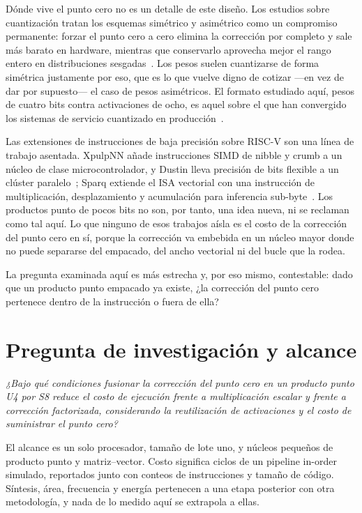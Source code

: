 Dónde vive el punto cero no es un detalle de este diseño. Los estudios sobre
cuantización tratan los esquemas simétrico y asimétrico como un compromiso
permanente: forzar el punto cero a cero elimina la corrección por completo y
sale más barato en hardware, mientras que conservarlo aprovecha mejor el rango
entero en distribuciones sesgadas~\cite{gholami}. Los pesos suelen cuantizarse
de forma simétrica justamente por eso, que es lo que vuelve digno de cotizar
—en vez de dar por supuesto— el caso de pesos asimétricos. El formato estudiado
aquí, pesos de cuatro bits contra activaciones de ocho, es aquel sobre el que
han convergido los sistemas de servicio cuantizado en producción~\cite{qserve}.

Las extensiones de instrucciones de baja precisión sobre RISC-V son una línea de
trabajo asentada. XpulpNN añade instrucciones SIMD de nibble y crumb a un núcleo
de clase microcontrolador, y Dustin lleva precisión de bits flexible a un
clúster paralelo~\cite{xpulpnn,dustin}; Sparq extiende el ISA vectorial con una
instrucción de multiplicación, desplazamiento y acumulación para inferencia
sub-byte~\cite{sparq}. Los productos punto de pocos bits no son, por tanto, una
idea nueva, ni se reclaman como tal aquí. Lo que ninguno de esos trabajos aísla
es el costo de la corrección del punto cero en sí, porque la corrección va
embebida en un núcleo mayor donde no puede separarse del empacado, del ancho
vectorial ni del bucle que la rodea.

La pregunta examinada aquí es más estrecha y, por eso mismo, contestable: dado
que un producto punto empacado ya existe, ¿la corrección del punto cero
pertenece dentro de la instrucción o fuera de ella?

\section{Pregunta de investigación y alcance}
\textit{¿Bajo qué condiciones fusionar la corrección del punto cero en un
producto punto U4 por S8 reduce el costo de ejecución frente a multiplicación
escalar y frente a corrección factorizada, considerando la reutilización de
activaciones y el costo de suministrar el punto cero?}

El alcance es un solo procesador, tamaño de lote uno, y núcleos pequeños de
producto punto y matriz--vector. Costo significa ciclos de un pipeline in-order
simulado, reportados junto con conteos de instrucciones y tamaño de código. Síntesis,
área, frecuencia y energía pertenecen a una etapa posterior con otra
metodología, y nada de lo medido aquí se extrapola a ellas.

